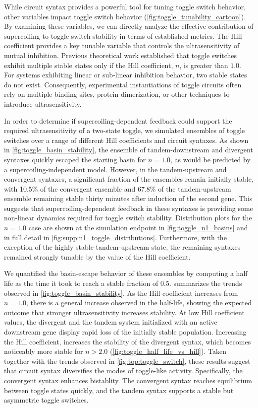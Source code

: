 \documentclass[11pt]{article}
\begin{document}
While circuit syntax provides a powerful tool for tuning toggle switch behavior, other variables impact toggle switch behavior (\cref{fig:toggle_tunability_cartoon}). By examining these variables, we can directly analyze the effective contribution of supercoiling to toggle switch stability in terms of established metrics. The Hill coefficient provides a key tunable variable that controls the ultrasensitivity of mutual inhibition.
 Previous theoretical work established that toggle switches exhibit multiple stable states only if the Hill coefficient, \(n\), is greater than \(1.0\). For systems exhibiting linear or sub-linear inhibition behavior, two stable states do not exist. Consequently, experimental instantiations of toggle circuits often rely on multiple binding sites, protein dimerization, or other techniques to introduce ultrasensitivity.

In order to determine if supercoiling-dependent feedback could support the required ultrasensitivity of a two-state toggle, we simulated ensembles of toggle switches over a range of different Hill coefficients and circuit syntaxes. As shown in \cref{fig:toggle_basin_stability}, the ensemble of tandem-downstream and divergent syntaxes quickly escaped the starting basin for \(n = 1.0\), as would be predicted by a supercoiling-independent model. However, in the tandem-upstream and convergent syntaxes, a significant fraction of the ensembles remain initially stable, with 10.5\% of the convergent ensemble and 67.8\% of the tandem-upstream ensemble remaining stable thirty minutes after induction of the second gene. This suggests that supercoiling-dependent feedback in these syntaxes is providing some non-linear dynamics required for toggle switch stability. Distribution plots for the \(n = 1.0\) case are shown at the simulation endpoint in \cref{fig:toggle_n1_basins} and in full detail in \cref{fig:supp:n1_toggle_distributions}.
Furthermore, with the exception of the highly stable tandem-upstream state, the remaining syntaxes remained strongly tunable by the value of the Hill coefficient.

We quantified the basin-escape behavior of these ensembles by computing a half life as the time it took to reach a stable fraction of \(0.5\).  summarizes the trends observed in \cref{fig:toggle_basin_stability}. As the Hill coefficient increases from \(n = 1.0\), there is a general increase observed in the half-life, showing the expected outcome that stronger ultrasensitivity increases stability. At low Hill coefficient values, the divergent and the tandem system initialized with an active downstream gene display rapid loss of the initially stable population.  Increasing the Hill coefficient, increases the stability of the divergent syntax, which becomes noticeably more stable for \(n > 2.0\) (\cref{fig:toggle_half_life_vs_hill}). Taken together with the trends observed in \cref{fig:top:toggle_switch}, these results suggest that circuit syntax diversifies the modes of toggle-like activity. Specifically, the convergent syntax enhances bistablity. The convergent syntax reaches equilibrium between toggle states quickly, and the tandem syntax supports a stable but asymmetric toggle switches.
\end{document}
